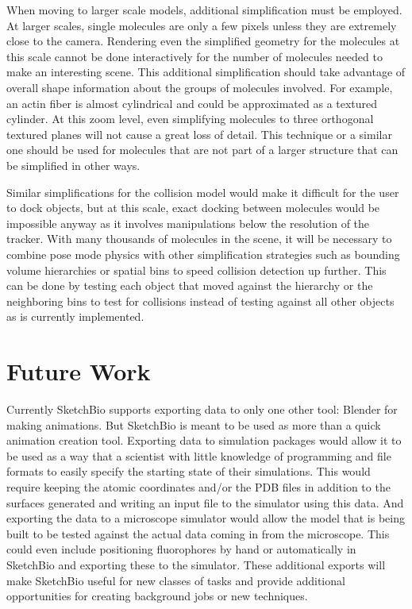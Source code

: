 \documentclass{article} %
\begin{document}
When moving to larger scale models, additional simplification must be employed.  At larger scales, single molecules are only a few pixels unless they are extremely close to the camera.  Rendering even the simplified geometry for the molecules at this scale cannot be done interactively for the number of molecules needed to make an interesting scene.  This additional simplification should take advantage of overall shape information about the groups of molecules involved.  For example, an actin fiber is almost cylindrical and could be approximated as a textured cylinder.  At this zoom level, even simplifying molecules to three orthogonal textured planes will not cause a great loss of detail.  This technique or a similar one should be used for molecules that are not part of a larger structure that can be simplified in other ways.

Similar simplifications for the collision model would make it difficult for the user to dock objects, but at this scale, exact docking between molecules would be impossible anyway as it involves manipulations below the resolution of the tracker.  With many thousands of molecules in the scene, it will be necessary to combine pose mode physics with other simplification strategies such as bounding volume hierarchies or spatial bins to speed collision detection up further.  This can be done by testing each object that moved against the hierarchy or the neighboring bins to test for collisions instead of testing against all other objects as is currently implemented.

\section{Future Work}
Currently SketchBio supports exporting data to only one other tool: Blender for making animations.  But SketchBio is meant to be used as more than a quick animation creation tool.  Exporting data to simulation packages would allow it to be used as a way that a scientist with little knowledge of programming and file formats to easily specify the starting state of their simulations.  This would require keeping the atomic coordinates and/or the PDB files in addition to the surfaces generated and writing an input file to the simulator using this data.  And exporting the data to a microscope simulator would allow the model that is being built to be tested against the actual data coming in from the microscope.  This could even include positioning fluorophores by hand or automatically in SketchBio and exporting these to the simulator.  These additional exports will make SketchBio useful for new classes of tasks and provide additional opportunities for creating background jobs or new techniques.
\end{document}
